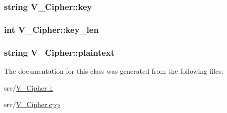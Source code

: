 \subsubsection[{\texorpdfstring{key}{key}}]{\setlength{\rightskip}{0pt plus 5cm}string V\+\_\+\+Cipher\+::key\hspace{0.3cm}{\ttfamily [private]}}\hypertarget{classV__Cipher_ac874cd4b414b817b42254493f8c16292}{}\label{classV__Cipher_ac874cd4b414b817b42254493f8c16292}
\subsubsection[{\texorpdfstring{key\+\_\+len}{key_len}}]{\setlength{\rightskip}{0pt plus 5cm}int V\+\_\+\+Cipher\+::key\+\_\+len\hspace{0.3cm}{\ttfamily [private]}}\hypertarget{classV__Cipher_ae9cbb4bb2cd246dcd743676a079eaf1b}{}\label{classV__Cipher_ae9cbb4bb2cd246dcd743676a079eaf1b}
\subsubsection[{\texorpdfstring{plaintext}{plaintext}}]{\setlength{\rightskip}{0pt plus 5cm}string V\+\_\+\+Cipher\+::plaintext\hspace{0.3cm}{\ttfamily [private]}}\hypertarget{classV__Cipher_a6dbd111ae202271a962ae9587efb55a3}{}\label{classV__Cipher_a6dbd111ae202271a962ae9587efb55a3}


The documentation for this class was generated from the following files\+:\begin{DoxyCompactItemize}
\item 
src/\hyperlink{V__Cipher_8h}{V\+\_\+\+Cipher.\+h}\item 
src/\hyperlink{V__Cipher_8cpp}{V\+\_\+\+Cipher.\+cpp}\end{DoxyCompactItemize}
